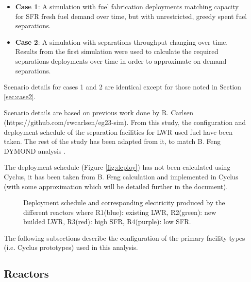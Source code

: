 \documentclass[12pt]{article}
\begin{document}
\begin{itemize}

    \item \textbf{Case 1}: A simulation with fuel fabrication deployments
        matching capacity for SFR fresh fuel demand over time, but with
        unrestricted, greedy spent fuel separations.

    \item \textbf{Case 2}: A simulation with separations throughput changing
        over time. Results from the first simulation were used to calculate
        the required separations deployments over time in order to approximate
        on-demand separations.

\end{itemize}

Scenario details for cases 1 and 2 are identical except for those noted in
Section \ref{sec:case2}.

Scenario details are based on previous work done by R. Carlsen
(https://github.com/rwcarlsen/eg23-sim).  From this study, the configuration
and deployment schedule of the separation facilities for LWR used fuel have
been taken. The rest of the study has been adapted from it, to match B. Feng
DYMOND analysis \cite{B.Feng_calculation}.

The deployment schedule (Figure \ref{fig:deploy}) has not been calculated
using Cyclus, it has been taken from B. Feng calculation and implemented in
Cyclus (with some approximation which will be detailed further in the
document).

\begin{figure}[h!]
    \centering
    \caption{
        Deployment schedule and corresponding electricity produced by the
        different reactors where R1(blue): existing LWR, R2(green): new
        builded LWR, R3(red): high SFR, R4(purple): low
        SFR.\label{fig:deployment}
    }
\end{figure}

The following subsections describe the configuration of the primary facility
types (i.e. Cyclus prototypes) used in this analysis.

\subsection{Reactors}
\end{document}
